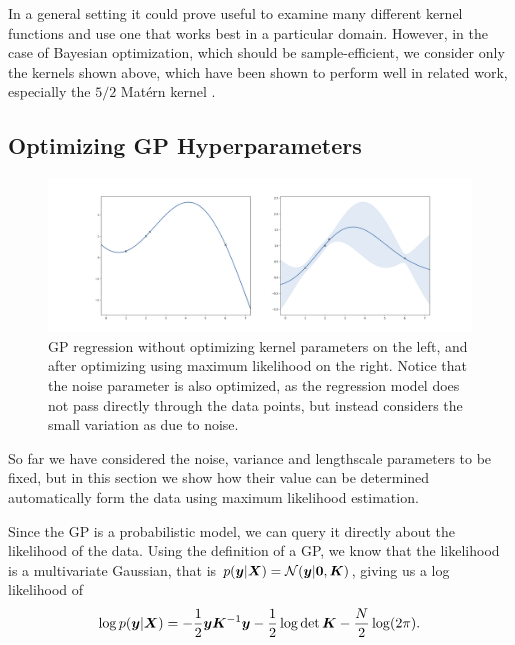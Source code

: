 In a general setting it could prove useful to examine many different kernel functions and use one that works best in a particular domain. However, in the case of Bayesian optimization, which should be sample-efficient, we consider only the kernels shown above, which have been shown to perform well in related work, especially the $5/2$ Mat\'ern kernel \citep{snoek2012practical}.

\subsection{Optimizing GP Hyperparameters}

\begin{figure}
	\begin{center}
		\includegraphics[width=1.0\textwidth]{images/gp-kernel-param-optimization.png}
		\caption{GP regression without optimizing kernel parameters on the left,
			and after optimizing using maximum likelihood on the right. Notice that
			the noise parameter is also optimized, as the regression model does not
			pass directly through the data points, but instead considers the small
			variation as due to noise.}
		\label{figure:gp-kernel-param-optimization}
	\end{center}
\end{figure}


So far we have considered the noise, variance and lengthscale parameters to be
fixed, but in this section we show how their value can be determined
automatically form the data using maximum likelihood estimation.

Since the GP is a probabilistic model, we can query it directly about the
likelihood of the data. Using the definition of a GP, we know that the
likelihood is a multivariate Gaussian, that is $p({\boldsymbol{y}} | {\bm{X}}) =
\mathcal{N}({\boldsymbol{y}} | {\bm{0}}, {\bm{K}})$, giving us a log likelihood of
\begin{equation}
\log p({\boldsymbol{y}} | {\bm{X}}) = -\frac{1}{2}{\boldsymbol{y}} {\bm{K}}^{-1}{\boldsymbol{y}} - \frac{1}{2} \log \det {\bm{K}} - \frac{N}{2} \log (2 \pi).
\label{eq:kernel-marginal-likelihood}
\end{equation}

